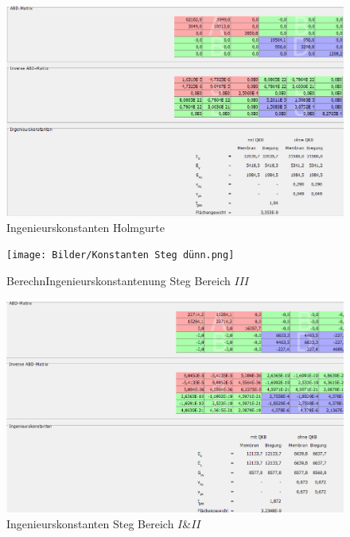 \begin{figure}
	\includegraphics[width=1.0\textwidth]{Bilder/Konstanten Holmgurte.png}
	\caption{Ingenieurskonstanten Holmgurte}
	\label{fig:Ingenieurskonstanten Holmgurte}
\end{figure}
\begin{figure}
	\texttt{[image: Bilder/Konstanten Steg dünn.png]}
	\caption{BerechnIngenieurskonstantenung Steg Bereich $III$}
	\label{fig:Ingenieurskonstanten Steg dünn}
\end{figure}
\begin{figure}
	\includegraphics[width=1.0\textwidth]{Bilder/Konstanten Steg dick.png}
	\caption{Ingenieurskonstanten Steg Bereich $I$\&$II$}
	\label{fig:Ingenieurskonstanten Steg dick}
\end{figure}
